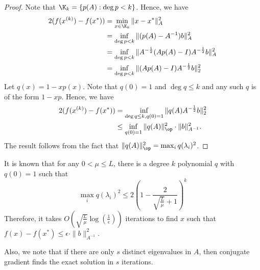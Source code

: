 \begin{proof}
Note that $\K_{k}=\{p(A):\deg p<k\}$. Hence, we have
\begin{align*}
2(f(x^{(k)})-f(x^{*})) & =\min_{x\in\K_{k}}\|x-x^{*}\|_{A}^{2}\\
 & =\inf_{\deg p<k}\|(p(A)-A^{-1})b\|_{A}^{2}\\
 & =\inf_{\deg p<k}\|A^{-\frac{1}{2}}(Ap(A)-I)A^{-\frac{1}{2}}b\|_{A}^{2}\\
 & =\inf_{\deg p<k}\|(Ap(A)-I)A^{-\frac{1}{2}}b\|_{2}^{2}
\end{align*}
Let $q(x)=1-xp(x)$. Note that $q(0)=1$ and $\deg q\leq k$ and any
such $q$ is of the form $1-xp$. Hence, we have
\begin{align*}
2(f(x^{(k)})-f(x^{*})) & =\inf_{\deg q\leq k,q(0)=1}\|q(A)A^{-\frac{1}{2}}b\|_{2}^{2}\\
 & \leq\inf_{q(0)=1}\|q(A)\|_{\op}^{2}\cdot\|b\|_{A^{-1}}^{2}.
\end{align*}
The result follows from the fact that $\|q(A)\|_{\op}^{2}=\max_{i}q(\lambda_{i})^{2}$.
\end{proof}
It is known that for any $0<\mu\leq L$, there is a degree $k$ polynomial
$q$ with $q(0)=1$ such that
\[
\max_{i}q(\lambda_{i})^{2}\leq2\left(1-\frac{2}{\sqrt{\frac{L}{\mu}}+1}\right)^{k}
\]
Therefore, it takes $O(\sqrt{\frac{L}{\mu}}\log(\frac{1}{\epsilon}))$
iterations to find $x$ such that $f(x)-f(x^{*})\leq\epsilon\cdot\|b\|_{A^{-1}}^{2}$.

Also, we note that if there are only $s$ distinct eigenvalues in
$A$, then conjugate gradient finds the exact solution in $s$ iterations.

%

